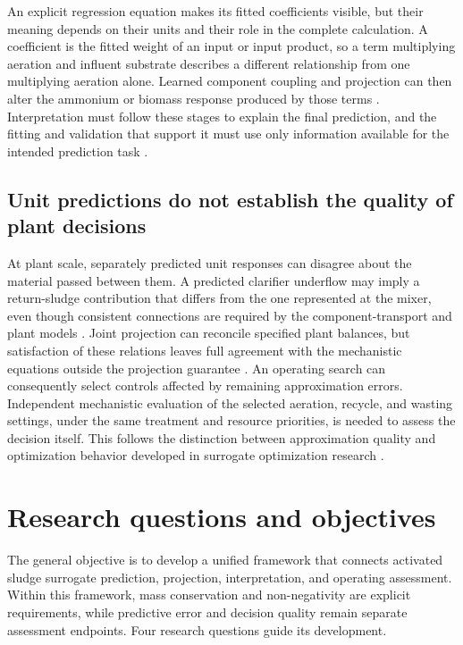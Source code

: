 An explicit regression equation makes its fitted coefficients visible, but their meaning depends on their units and their role in the complete calculation. A coefficient is the fitted weight of an input or input product, so a term multiplying aeration and influent substrate describes a different relationship from one multiplying aeration alone. Learned component coupling and projection can then alter the ammonium or biomass response produced by those terms \citep{Selerio2026}. Interpretation must follow these stages to explain the final prediction, and the fitting and validation that support it must use only information available for the intended prediction task \citep{Kaufman2012}.

\subsection{Unit predictions do not establish the quality of plant decisions}

At plant scale, separately predicted unit responses can disagree about the material passed between them. A predicted clarifier underflow may imply a return-sludge contribution that differs from the one represented at the mixer, even though consistent connections are required by the component-transport and plant models \citep{JeppssonDiehl1996,Alex2008}. Joint projection can reconcile specified plant balances, but satisfaction of these relations leaves full agreement with the mechanistic equations outside the projection guarantee \citep{KircherVotsmeier2025,Selerio2026}. An operating search can consequently select controls affected by remaining approximation errors. Independent mechanistic evaluation of the selected aeration, recycle, and wasting settings, under the same treatment and resource priorities, is needed to assess the decision itself. This follows the distinction between approximation quality and optimization behavior developed in surrogate optimization research \citep{Alexandrov1998,Pedrozo2025}.

\section{Research questions and objectives}
\label{sec:research_questions}

The general objective is to develop a unified framework that connects activated sludge surrogate prediction, projection, interpretation, and operating assessment. Within this framework, mass conservation and non-negativity are explicit requirements, while predictive error and decision quality remain separate assessment endpoints. Four research questions guide its development.

